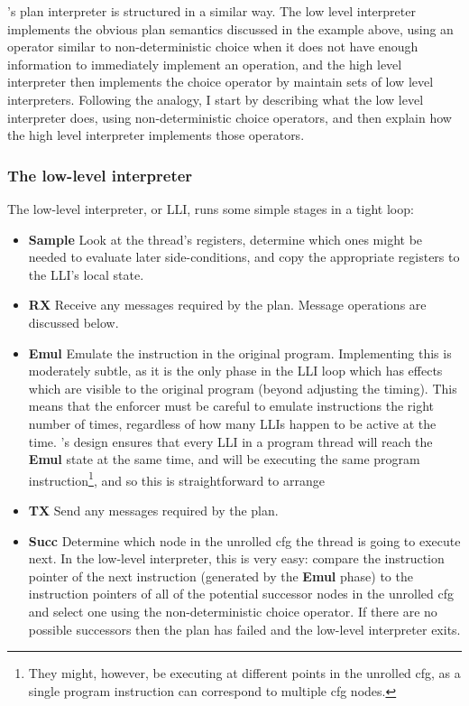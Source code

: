 {\Implementation}'s plan interpreter is structured in a similar way.
The low level interpreter implements the obvious plan semantics
discussed in the example above, using an operator similar to
non-deterministic choice when it does not have enough information to
immediately implement an operation, and the high level interpreter
then implements the choice operator by maintain sets of low level
interpreters.  Following the analogy, I start by describing what the
low level interpreter does, using non-deterministic choice operators,
and then explain how the high level interpreter implements those
operators.

\subsubsection{The low-level interpreter}
\label{sect:enforce:llis}

The low-level interpreter, or LLI, runs some simple stages in a tight
loop:

\begin{itemize}
\item \textbf{Sample} Look at the thread's registers, determine which
  ones might be needed to evaluate later side-conditions, and copy the
  appropriate registers to the LLI's local state.

\item \textbf{RX} Receive any messages required by the plan.  Message
  operations are discussed below.

\item \textbf{Emul} Emulate the instruction in the original program.
  Implementing this is moderately subtle, as it is the only phase in
  the LLI loop which has effects which are visible to the original
  program (beyond adjusting the timing).  This means that the enforcer
  must be careful to emulate instructions the right number of times,
  regardless of how many LLIs happen to be active at the time.
  {\Technique}'s design ensures that every LLI in a program thread
  will reach the \textbf{Emul} state at the same time, and will be
  executing the same program instruction\footnote{They might, however,
    be executing at different points in the unrolled \gls{cfg}, as a single
    program instruction can correspond to multiple \gls{cfg} nodes.}, and so
  this is straightforward to arrange

\item \textbf{TX} Send any messages required by the plan.

\item \textbf{Succ} Determine which node in the unrolled \gls{cfg} the
  thread is going to execute next.  In the low-level interpreter, this
  is very easy: compare the instruction pointer of the next
  instruction (generated by the \textbf{Emul} phase) to the
  instruction pointers of all of the potential successor nodes in the
  unrolled \gls{cfg} and select one using the non-deterministic choice
  operator.  If there are no possible successors then the plan has
  failed and the low-level interpreter exits.
\end{itemize}

